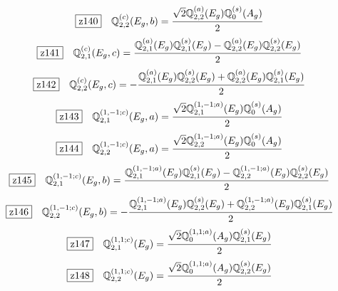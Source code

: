 \documentclass[fleqn,10pt,landscape]{jsarticle}
\begin{document}
\begin{dmath*}
\hspace*{3mm}\fbox{z140}\quad \mathbb{Q}_{2,2}^{(c)}(E_{g},b)=\frac{\sqrt{2} \mathbb{Q}_{2,2}^{(a)}(E_{g}) \mathbb{Q}_{0}^{(s)}(A_{g})}{2}
\end{dmath*}
\begin{dmath*}
\hspace*{3mm}\fbox{z141}\quad \mathbb{Q}_{2,1}^{(c)}(E_{g},c)=\frac{\mathbb{Q}_{2,1}^{(a)}(E_{g}) \mathbb{Q}_{2,1}^{(s)}(E_{g}) - \mathbb{Q}_{2,2}^{(a)}(E_{g}) \mathbb{Q}_{2,2}^{(s)}(E_{g})}{2}
\end{dmath*}
\begin{dmath*}
\hspace*{3mm}\fbox{z142}\quad \mathbb{Q}_{2,2}^{(c)}(E_{g},c)=- \frac{\mathbb{Q}_{2,1}^{(a)}(E_{g}) \mathbb{Q}_{2,2}^{(s)}(E_{g}) + \mathbb{Q}_{2,2}^{(a)}(E_{g}) \mathbb{Q}_{2,1}^{(s)}(E_{g})}{2}
\end{dmath*}
\begin{dmath*}
\hspace*{3mm}\fbox{z143}\quad \mathbb{Q}_{2,1}^{(1,-1;c)}(E_{g},a)=\frac{\sqrt{2} \mathbb{Q}_{2,1}^{(1,-1;a)}(E_{g}) \mathbb{Q}_{0}^{(s)}(A_{g})}{2}
\end{dmath*}
\begin{dmath*}
\hspace*{3mm}\fbox{z144}\quad \mathbb{Q}_{2,2}^{(1,-1;c)}(E_{g},a)=\frac{\sqrt{2} \mathbb{Q}_{2,2}^{(1,-1;a)}(E_{g}) \mathbb{Q}_{0}^{(s)}(A_{g})}{2}
\end{dmath*}
\begin{dmath*}
\hspace*{3mm}\fbox{z145}\quad \mathbb{Q}_{2,1}^{(1,-1;c)}(E_{g},b)=\frac{\mathbb{Q}_{2,1}^{(1,-1;a)}(E_{g}) \mathbb{Q}_{2,1}^{(s)}(E_{g}) - \mathbb{Q}_{2,2}^{(1,-1;a)}(E_{g}) \mathbb{Q}_{2,2}^{(s)}(E_{g})}{2}
\end{dmath*}
\begin{dmath*}
\hspace*{3mm}\fbox{z146}\quad \mathbb{Q}_{2,2}^{(1,-1;c)}(E_{g},b)=- \frac{\mathbb{Q}_{2,1}^{(1,-1;a)}(E_{g}) \mathbb{Q}_{2,2}^{(s)}(E_{g}) + \mathbb{Q}_{2,2}^{(1,-1;a)}(E_{g}) \mathbb{Q}_{2,1}^{(s)}(E_{g})}{2}
\end{dmath*}
\begin{dmath*}
\hspace*{3mm}\fbox{z147}\quad \mathbb{Q}_{2,1}^{(1,1;c)}(E_{g})=\frac{\sqrt{2} \mathbb{Q}_{0}^{(1,1;a)}(A_{g}) \mathbb{Q}_{2,1}^{(s)}(E_{g})}{2}
\end{dmath*}
\begin{dmath*}
\hspace*{3mm}\fbox{z148}\quad \mathbb{Q}_{2,2}^{(1,1;c)}(E_{g})=\frac{\sqrt{2} \mathbb{Q}_{0}^{(1,1;a)}(A_{g}) \mathbb{Q}_{2,2}^{(s)}(E_{g})}{2}
\end{dmath*}
\end{document}
